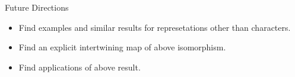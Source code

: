\documentclass[final,hyperref={pdfpagelabels=false}]{beamer} %
\begin{document}
\begin{frame}
\begin{columns}[t]
\begin{column}{.48\linewidth}
     \begin{block}{Future Directions}
         \begin{itemize}
           \item  Find  examples and similar results 
             for represetations other than characters.
           \item Find an explicit intertwining map of above isomorphism.
           \item Find applications of above result.
         \end{itemize}
     \end{block}

     
%         
   \end{column}
 \end{columns}
\end{frame}
\end{document}
